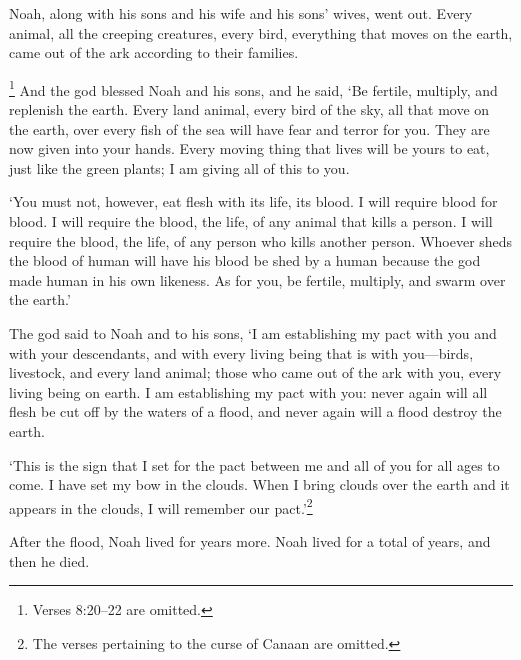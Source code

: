 Noah, along with his sons and his wife and his sons' wives, went
out. Every animal, all the creeping creatures, every bird, everything
that moves on the earth, came out of the ark according to their families.

\footnote{Verses 8:20--22 are omitted.}
And the god blessed Noah and his sons, and he said, 
`Be fertile, multiply, and replenish the earth. 
Every land animal,
every bird of the sky,
all that move on the earth, 
over every fish of the sea 
will have fear and terror for you. 
They are now given into your hands. 
Every moving thing that lives will be yours to eat,
just like the green plants;
I am giving all of this to you.

`You must not, however, eat flesh with its life, its blood.
I will require blood for blood.
I will require the blood, the life, of any animal that kills a person.
I will require the blood, the life, of any person who kills another person.
Whoever sheds the blood of human will have his blood be shed by a human 
because the god made human in his own likeness.
As for you, be fertile, multiply, and swarm over the earth.'

The god said to Noah and to his sons, 
`I am establishing my pact with you and with your descendants, 
and with every living being that is with you---birds, livestock, and every land animal;
those who came out of the ark with you, 
every living being on earth. 
I am establishing my pact with you: 
never again will all
flesh be cut off by the waters of a flood, 
and never again will a flood destroy the earth.

`This is the sign that I set for the pact 
between me and all of you for all ages to come.
I have set my bow in the clouds. 
When I bring clouds over the earth and it appears in the clouds,
I will remember our pact.'\footnote{The verses
pertaining to the curse of Canaan are omitted.}

After the flood, Noah lived for  years more. 
Noah lived for a total of  years,
and then he died.

